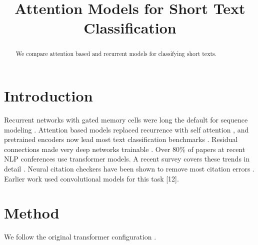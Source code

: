\documentclass{article}
\begin{document}
\title{Attention Models for Short Text Classification}
\maketitle

\begin{abstract}
We compare attention based and recurrent models for classifying short texts.
\end{abstract}

\section{Introduction}
Recurrent networks with gated memory cells were long the default for sequence modeling \citep{hochreiter1997long}.
Attention based models replaced recurrence with self attention \citep{vaswani2017attention}, and pretrained encoders now lead most text classification benchmarks \citep{devlin2019bert}.
Residual connections made very deep networks trainable \citep{he2016deep}.
Over 80\% of papers at recent NLP conferences use transformer models.
A recent survey covers these trends in detail \citep{liu2023survey}.
Neural citation checkers have been shown to remove most citation errors \citep{doe2024neural}.
Earlier work used convolutional models for this task [12].

\section{Method}
We follow the original transformer configuration \citep{vaswani2017}.



\end{document}
